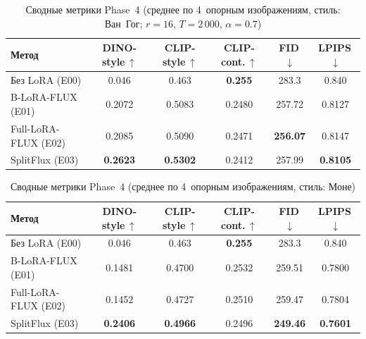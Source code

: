 \begin{table}[h]
\centering
\caption{Сводные метрики Phase~4 (среднее по 4~опорным изображениям, стиль: Ван~Гог; $r{=}16$, $T{=}2\,000$, $\alpha{=}0.7$)}
\label{tab:phase4_vg_summary}
\begingroup\small
\begin{tabular}{lccccc}
\hline
\textbf{Метод}        & \textbf{DINO-style\,$\uparrow$} & \textbf{CLIP-style\,$\uparrow$} & \textbf{CLIP-cont.\,$\uparrow$} & \textbf{FID\,$\downarrow$} & \textbf{LPIPS\,$\downarrow$} \\
\hline
Без LoRA (E00)        & 0.046          & 0.463          & \textbf{0.255} & 283.3          & 0.840          \\
B-LoRA-FLUX (E01)     & 0.2072         & 0.5083         & 0.2480         & 257.72         & 0.8127         \\
Full-LoRA-FLUX (E02)  & 0.2085         & 0.5090         & 0.2471         & \textbf{256.07} & 0.8147         \\
SplitFlux (E03)       & \textbf{0.2623} & \textbf{0.5302} & 0.2412         & 257.99         & \textbf{0.8105} \\
\hline
\end{tabular}\endgroup
\end{table}

\begin{table}[h]
\centering
\caption{Сводные метрики Phase~4 (среднее по 4~опорным изображениям, стиль: Моне)}
\label{tab:phase4_monet_summary}
\begingroup\small
\begin{tabular}{lccccc}
\hline
\textbf{Метод}        & \textbf{DINO-style\,$\uparrow$} & \textbf{CLIP-style\,$\uparrow$} & \textbf{CLIP-cont.\,$\uparrow$} & \textbf{FID\,$\downarrow$} & \textbf{LPIPS\,$\downarrow$} \\
\hline
Без LoRA (E00)        & 0.046          & 0.463          & \textbf{0.255} & 283.3          & 0.840          \\
B-LoRA-FLUX (E01)     & 0.1481         & 0.4700         & 0.2532         & 259.51         & 0.7800         \\
Full-LoRA-FLUX (E02)  & 0.1452         & 0.4727         & 0.2510         & 259.47         & 0.7804         \\
SplitFlux (E03)       & \textbf{0.2406} & \textbf{0.4966} & 0.2496         & \textbf{249.46} & \textbf{0.7601} \\
\hline
\end{tabular}\endgroup
\end{table}

